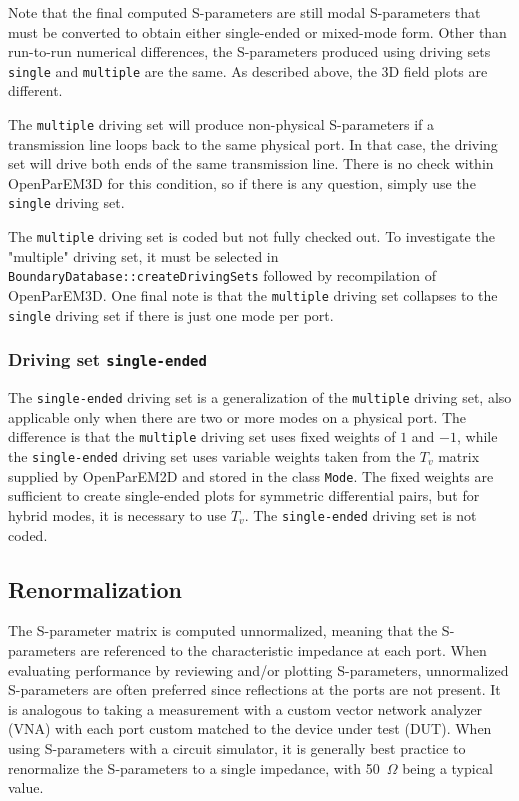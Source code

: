 \documentclass[titlepage]{article}
\renewcommand\_{\textunderscore\linebreak[1]}
\begin{document}
Note that the final computed S-parameters are still modal S-parameters that must be converted to obtain either single-ended or mixed-mode form.  Other than run-to-run numerical differences, the S-parameters produced using driving sets \texttt{single} and \texttt{multiple} are the same.  As described above, the 3D field plots are different.

The \texttt{multiple} driving set will produce non-physical S-parameters if a transmission line loops back to the same physical port.  In that case, the driving set will drive both ends of the same transmission line.  There is no check within OpenParEM3D for this condition, so if there is any question, simply use the \texttt{single} driving set.

The \texttt{multiple} driving set is coded but not fully checked out.  To investigate the "multiple" driving set, it must be selected in \texttt{BoundaryDatabase::createDrivingSets} followed by recompilation of OpenParEM3D.  One final note is that the \texttt{multiple} driving set collapses to the \texttt{single} driving set if there is just one mode per port.

\subsubsection{Driving set \texttt{single-ended}}

The \texttt{single-ended} driving set is a generalization of the \texttt{multiple} driving set, also applicable only when there are two or more modes on a physical port.  The difference is that the \texttt{multiple} driving set uses fixed weights of $1$ and $-1$, while the \texttt{single-ended} driving set uses variable weights taken from the $T_v$ matrix supplied by OpenParEM2D and stored in the class \texttt{Mode}.  The fixed weights are sufficient to create single-ended plots for symmetric differential pairs, but for hybrid modes, it is necessary to use $T_v$.  The \texttt{single-ended} driving set is not coded.

\subsection{Renormalization}

The S-parameter matrix is computed unnormalized, meaning that the S-parameters are referenced to the characteristic impedance at each port.  When evaluating performance by reviewing and/or plotting S-parameters, unnormalized S-parameters are often preferred since reflections at the ports are not present.  It is analogous to taking a measurement with a custom vector network analyzer (VNA) with each port custom matched to the device under test (DUT).
When using S-parameters with a circuit simulator, it is generally best practice to renormalize the S-parameters to a single impedance, with 50~$\Omega$ being a typical value.
\end{document}
